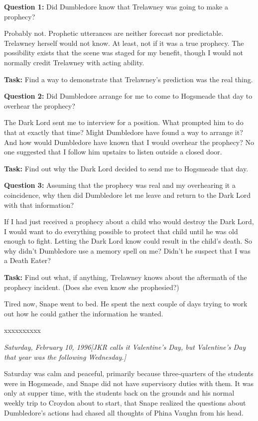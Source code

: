\documentclass[a4paper,11pt]{article}
\begin{document}
\textbf{Question 1:} Did Dumbledore know that Trelawney was going to make a prophecy?

Probably not. Prophetic utterances are neither forecast nor predictable. Trelawney herself would not know. At least, not if it was a true prophecy. The possibility exists that the scene was staged for my benefit, though I would not normally credit Trelawney with acting ability.

\textbf{Task:} Find a way to demonstrate that Trelawney's prediction was the real thing.

\textbf{Question 2:} Did Dumbledore arrange for me to come to Hogsmeade that day to overhear the prophecy?

The Dark Lord sent me to interview for a position. What prompted him to do that at exactly that time? Might Dumbledore have found a way to arrange it? And how would Dumbledore have known that I would overhear the prophecy? No one suggested that I follow him upstairs to listen outside a closed door.

\textbf{Task:} Find out why the Dark Lord decided to send me to Hogsmeade that day.

\textbf{Question 3: }Assuming that the prophecy was real and my overhearing it a coincidence, why then did Dumbledore let me leave and return to the Dark Lord with that information?

If I had just received a prophecy about a child who would destroy the Dark Lord, I would want to do everything possible to protect that child until he was old enough to fight. Letting the Dark Lord know could result in the child's death. So why didn't Dumbledore use a memory spell on me? Didn't he suspect that I was a Death Eater?

\textbf{Task:} Find out what, if anything, Trelawney knows about the aftermath of the prophecy incident. (Does she even know she prophesied?)

Tired now, Snape went to bed. He spent the next couple of days trying to work out how he could gather the information he wanted.

xxxxxxxxxx

\emph{Saturday, February 10, 1996}\emph{[JKR calls it Valentine's Day, but Valentine's Day that year was the following Wednesday.]}

Saturday was calm and peaceful, primarily because three-quarters of the students were in Hogsmeade, and Snape did not have supervisory duties with them. It was only at supper time, with the students back on the grounds and his normal weekly trip to Croydon about to start, that Snape realized the questions about Dumbledore's actions had chased all thoughts of Phina Vaughn from his head.
\end{document}
